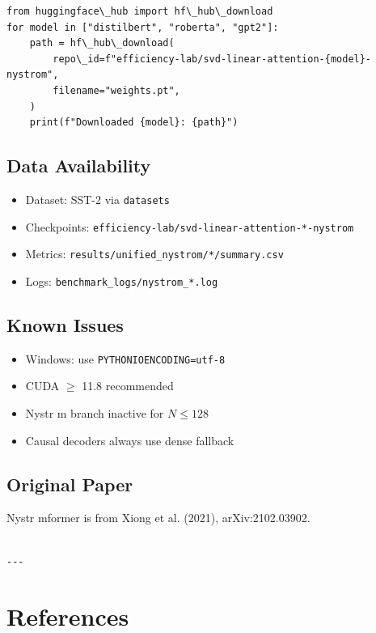 \begin{lstlisting}
from huggingface\_hub import hf\_hub\_download
for model in ["distilbert", "roberta", "gpt2"]:
    path = hf\_hub\_download(
        repo\_id=f"efficiency-lab/svd-linear-attention-{model}-nystrom",
        filename="weights.pt",
    )
    print(f"Downloaded {model}: {path}")
\end{lstlisting}

\subsection{Data Availability}

\begin{itemize}
\item Dataset: SST-2 via \texttt{datasets}
\item Checkpoints: \texttt{efficiency-lab/svd-linear-attention-*-nystrom}
\item Metrics: \texttt{results/unified\_nystrom/*/summary.csv}
\item Logs: \texttt{benchmark\_logs/nystrom\_*.log}

\end{itemize}
\subsection{Known Issues}

\begin{itemize}
\item Windows: use \texttt{PYTHONIOENCODING=utf-8}
\item CUDA $\ge$ 11.8 recommended
\item Nystr m branch inactive for $N \leq 128$
\item Causal decoders always use dense fallback

\end{itemize}
\subsection{Original Paper}

Nystr mformer is from Xiong et al. (2021), arXiv:2102.03902.
\begin{lstlisting}

---
\end{lstlisting}


\section{References}

